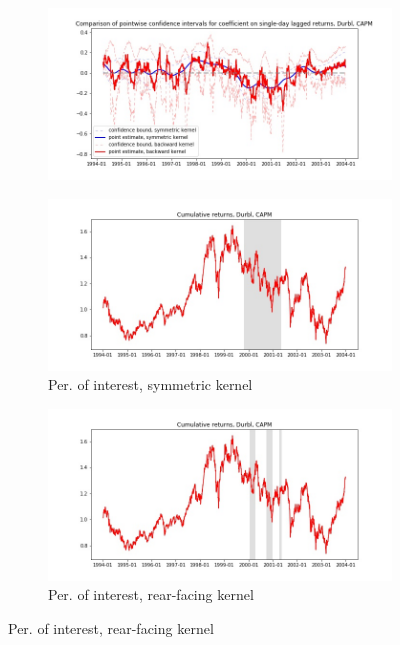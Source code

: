 \documentclass{article}
\begin{document}
\begin{figure}

\centering

  \begin{subfigure}[b]{\textwidth}
    \includegraphics[width=\textwidth]{Durbl/pointwiseCIs_layered_CAPM.jpg}
    \label{fig:1}
  \end{subfigure}
  \begin{subfigure}[b]{0.45\textwidth}
    \includegraphics[width=\textwidth]{Durbl/full_cumrets_ofint_CAPM.jpg}
    \caption*{Per. of interest, symmetric kernel}
    \label{fig:2}
  \end{subfigure}
   \begin{subfigure}[b]{0.45\textwidth}
    \includegraphics[width=\textwidth]{Durbl/bwunif_full_cumrets_ofint_CAPM.jpg}
    \caption*{Per. of interest, rear-facing kernel}
    \label{fig:2}
  \end{subfigure}
  
\end{figure}
\end{document}
